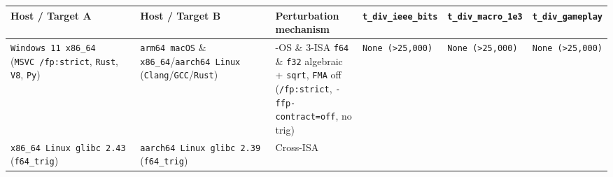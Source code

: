 \documentclass[10pt,letterpaper]{article}
\begin{document}
{\scriptsize\setlength{\tabcolsep}{3.0pt}\renewcommand{\arraystretch}{1.14}
\begin{longtable}[]{@{}
  >{\raggedright\arraybackslash}p{}
  >{\raggedright\arraybackslash}p{}
  >{\raggedright\arraybackslash}p{}
  >{\raggedleft\arraybackslash}p{}
  >{\raggedleft\arraybackslash}p{}
  >{\raggedleft\arraybackslash}p{}@{}}
\toprule\noalign{}
\begin{minipage}[b]{\linewidth}\raggedright
\textbf{Host / Target A}
\end{minipage} & \begin{minipage}[b]{\linewidth}\raggedright
\textbf{Host / Target B}
\end{minipage} & \begin{minipage}[b]{\linewidth}\raggedright
\textbf{Perturbation mechanism}
\end{minipage} & \begin{minipage}[b]{\linewidth}\raggedleft
\textbf{\texttt{t\_\allowbreak{}div\_\allowbreak{}ieee\_\allowbreak{}bits}}
\end{minipage} & \begin{minipage}[b]{\linewidth}\raggedleft
\textbf{\texttt{t\_\allowbreak{}div\_\allowbreak{}macro\_\allowbreak{}1e3}}
\end{minipage} & \begin{minipage}[b]{\linewidth}\raggedleft
\textbf{\texttt{t\_\allowbreak{}div\_\allowbreak{}gameplay}}
\end{minipage} \\
\midrule\noalign{}
\endhead
\bottomrule\noalign{}
\endlastfoot
\texttt{Windows\ 11\ x86\_\allowbreak{}64} (\texttt{MSVC\ /\allowbreak{}fp:strict}, \texttt{Rust},
\texttt{V8}, \texttt{Py}) & \texttt{arm64\ macOS} \&
\texttt{x86\_64}/\allowbreak{}\texttt{aarch64\ Linux}
(\texttt{Clang}/\allowbreak{}\texttt{GCC}/\allowbreak{}\texttt{Rust}) & 3-OS \& 3-ISA \texttt{f64}
\& \texttt{f32} algebraic + \texttt{sqrt}, \texttt{FMA} off
(\texttt{/\allowbreak{}fp:strict}, \texttt{-\allowbreak{}ffp-\allowbreak{}contract=off}, no trig) &
\texttt{None\ (\textgreater{}25,000)} &
\texttt{None\ (\textgreater{}25,000)} &
\texttt{None\ (\textgreater{}25,000)} \\
\texttt{x86\_\allowbreak{}64\ Linux\ glibc\ 2.\allowbreak{}43} (\texttt{f64\_trig}) &
\texttt{aarch64\ Linux\ glibc\ 2.\allowbreak{}39} (\texttt{f64\_trig}) & Cross-ISA

\end{longtable}}
\end{document}
